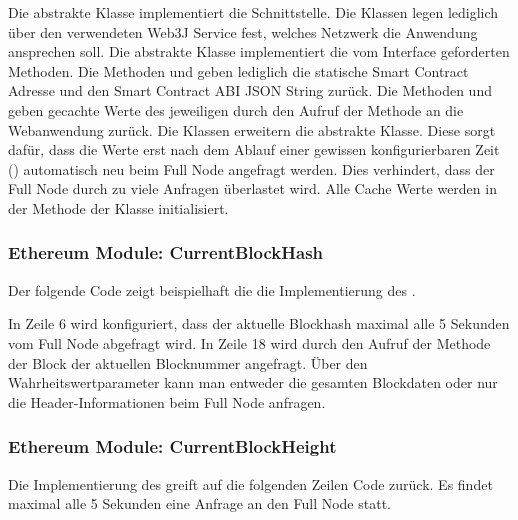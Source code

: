 Die abstrakte Klasse  implementiert die  Schnittstelle. Die Klassen  legen lediglich über den verwendeten Web3J Service fest, welches Netzwerk die Anwendung ansprechen soll.
Die abstrakte Klasse  implementiert die vom  Interface geforderten Methoden. Die Methoden  und  geben lediglich die statische Smart Contract Adresse und den Smart Contract ABI JSON String zurück. Die Methoden  und  geben gecachte Werte des jeweiligen  durch den Aufruf der  Methode an die Webanwendung zurück. Die Klassen  erweitern die abstrakte  Klasse. Diese sorgt dafür, dass die Werte erst nach dem Ablauf einer gewissen konfigurierbaren Zeit () automatisch neu beim Full Node angefragt werden. Dies verhindert, dass der Full Node durch zu viele Anfragen überlastet wird. Alle Cache Werte werden in der  Methode der  Klasse initialisiert. 


\subsubsection{Ethereum Module: CurrentBlockHash}

Der folgende Code zeigt beispielhaft die die Implementierung des .



In Zeile 6 wird konfiguriert, dass der aktuelle Blockhash maximal alle 5 Sekunden vom Full Node abgefragt wird. In Zeile 18 wird durch den Aufruf der  Methode der Block der aktuellen Blocknummer angefragt. Über den Wahrheitswertparameter kann man entweder die gesamten Blockdaten oder nur die Header-Informationen beim Full Node anfragen.

\subsubsection{Ethereum Module: CurrentBlockHeight}
Die Implementierung des  greift auf die folgenden Zeilen Code zurück. Es findet maximal alle 5 Sekunden eine Anfrage an den Full Node statt.

